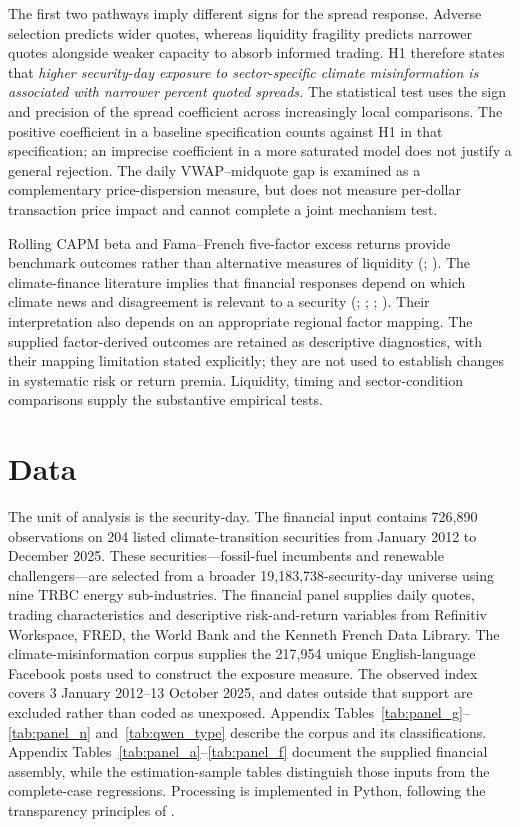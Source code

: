 \documentclass{article}
\theoremstyle{plain}
\begin{document}
The first two pathways imply different signs for the spread response. Adverse selection predicts wider quotes, whereas liquidity fragility predicts narrower quotes alongside weaker capacity to absorb informed trading. H1 therefore states that \emph{higher security-day exposure to sector-specific climate misinformation is associated with narrower percent quoted spreads.} The statistical test uses the sign and precision of the spread coefficient across increasingly local comparisons. The positive coefficient in a baseline specification counts against H1 in that specification; an imprecise coefficient in a more saturated model does not justify a general rejection. The daily VWAP--midquote gap is examined as a complementary price-dispersion measure, but does not measure per-dollar transaction price impact and cannot complete a joint mechanism test.

Rolling CAPM beta and Fama--French five-factor excess returns provide benchmark outcomes rather than alternative measures of liquidity (\cite{DeLongShleiferSummersWaldmann1990}; \cite{PastorVeronesi2012}). The climate-finance literature implies that financial responses depend on which climate news and disagreement is relevant to a security (\cite{engle2020hedging}; \cite{bolton2021climate}; \cite{HongLiXu2019}; \cite{pankratz2023climate}). Their interpretation also depends on an appropriate regional factor mapping. The supplied factor-derived outcomes are retained as descriptive diagnostics, with their mapping limitation stated explicitly; they are not used to establish changes in systematic risk or return premia. Liquidity, timing and sector-condition comparisons supply the substantive empirical tests.

\section{Data}
\label{sec:data}

The unit of analysis is the security-day. The financial input contains 726,890 observations on 204 listed climate-transition securities from January 2012 to December 2025. These securities---fossil-fuel incumbents and renewable challengers---are selected from a broader 19,183,738-security-day universe using nine TRBC energy sub-industries. The financial panel supplies daily quotes, trading characteristics and descriptive risk-and-return variables from Refinitiv Workspace, FRED, the World Bank and the Kenneth French Data Library. The climate-misinformation corpus supplies the 217,954 unique English-language Facebook posts used to construct the exposure measure. The observed index covers 3 January 2012--13 October 2025, and dates outside that support are excluded rather than coded as unexposed. Appendix Tables~\ref{tab:panel_g}--\ref{tab:panel_n} and~\ref{tab:qwen_type} describe the corpus and its classifications. Appendix Tables~\ref{tab:panel_a}--\ref{tab:panel_f} document the supplied financial assembly, while the estimation-sample tables distinguish those inputs from the complete-case regressions. Processing is implemented in Python, following the transparency principles of \textcite{ChristensenMiguel2018}.
\end{document}
